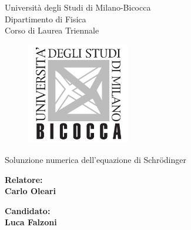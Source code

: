 \documentclass[12pt, twoside]{report}
\begin{document}
\begin{titlepage}
\begin{center}
    {\LARGE{Università degli Studi di Milano-Bicocca \\}}
    {\small{Dipartimento di Fisica}}\\
    {\small{Corso di Laurea Triennale}}
\end{center}
    
\begin{figure}[H]
    \centering
    \includegraphics[width=0.4\textwidth]{logo.png}
\end{figure}

\begin{center}
    {\Large { Solunzione numerica dell'equazione di Schr\"odinger}}
\end{center}

\vspace{2cm}

\begin{minipage}[t]{0.47\textwidth}
	{\large{\bf Relatore:\\ Carlo Oleari}}
\end{minipage}\hfill\begin{minipage}[t]{0.47\textwidth}\raggedleft
	{\large{\bf Candidato: \\Luca Falzoni\\ }}
\end{minipage}

\vspace{25mm}

\end{titlepage}

\tableofcontents
\thispagestyle{empty}


\thispagestyle{empty}
\clearpage
\setcounter{page}{1}


\clearpage







\clearpage




\printbibliography
\nocite{*}
\end{document}
